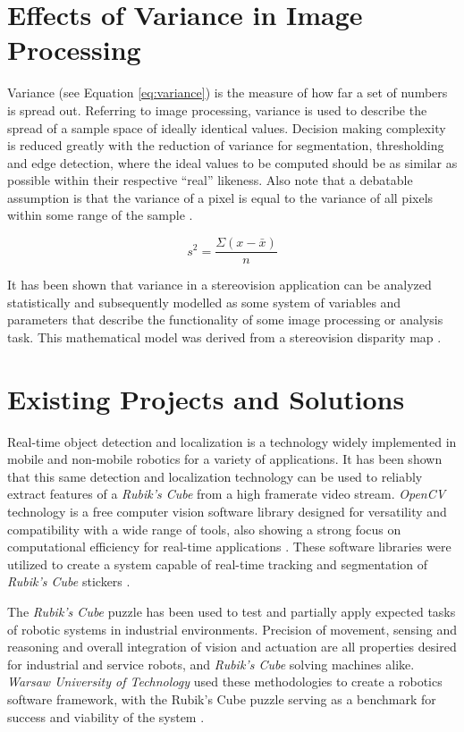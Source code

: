 \documentclass[11pt, a4paper, oneside]{Thesis} %
\begin{document}
\section{Effects of Variance in Image Processing}\label{sec:background_variance}
Variance (see Equation \ref{eq:variance}) is the measure of how far a set of numbers is spread out. Referring to image processing, variance is used to describe the spread of a sample space of ideally identical values. Decision making complexity is reduced greatly with the reduction of variance for segmentation, thresholding and edge detection, where the ideal values to be computed should be as similar as possible within their respective ``real'' likeness. Also note that a debatable assumption is that the variance of a pixel is equal to the variance of all pixels within some range of the sample \cite{lee1980digital}.
 
\begin{equation} \label{eq:variance}
s^2 = \frac{\Sigma(x-\bar{x})}{n}
\end{equation}

It has been shown that variance in a stereovision application can be analyzed statistically and subsequently modelled as some system of variables and parameters that describe the functionality of some image processing or analysis task. This mathematical model was derived from a stereovision disparity map \cite{matthies1994stochastic}.

\section{Existing Projects and Solutions}
Real-time object detection and localization is a technology widely implemented in mobile and non-mobile robotics for a variety of applications. It has been shown that this same detection and localization technology can be used to reliably extract features of a \emph{Rubik's Cube} from a high framerate video stream. \emph{OpenCV} technology is a free computer vision software library designed for versatility and compatibility with a wide range of tools, also showing a strong focus on computational efficiency for real-time applications \cite{opencvorg}. These software libraries were utilized to create a system capable of real-time tracking and segmentation of \emph{Rubik's Cube} stickers \cite{opencv}.

The \emph{Rubik's Cube} puzzle has been used to test and partially apply expected tasks of robotic systems in industrial environments. Precision of movement, sensing and reasoning and overall integration of vision and actuation are all properties desired for industrial and service robots, and \emph{Rubik's Cube} solving machines alike. \emph{Warsaw University of Technology} used these methodologies to create a robotics software framework, with the Rubik's Cube puzzle serving as a benchmark for success and viability of the system \cite{zielinski2006rubik}.
\end{document}
